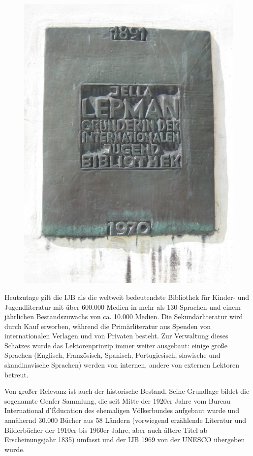 \documentclass[a4paper,
fontsize=11pt,
oneside,
numbers=noperiodatend,
parskip=half-,
bibliography=totoc,
final
]{scrartcl}
\begin{document}
\begin{figure}[htbp]
\centering
\includegraphics{img/bild15.jpg}
\end{figure}

Heutzutage gilt die IJB als die weltweit bedeutendste Bibliothek für
Kinder- und Jugendliteratur mit über 600.000 Medien in mehr als 130
Sprachen und einem jährlichen Bestandszuwachs von ca. 10.000 Medien. Die
Sekundärliteratur wird durch Kauf erworben, während die Primärliteratur
aus Spenden von internationalen Verlagen und von Privaten besteht. Zur
Verwaltung dieses Schatzes wurde das Lektorenprinzip immer weiter
ausgebaut: einige große Sprachen (Englisch, Französisch, Spanisch,
Portugiesisch, slawische und skandinavische Sprachen) werden von
internen, andere von externen Lektoren betreut.~

Von großer Relevanz ist auch der historische Bestand. Seine Grundlage
bildet die sogenannte Genfer Sammlung, die seit Mitte der 1920er Jahre
vom Bureau International d'Éducation des ehemaligen Völkerbundes
aufgebaut wurde und annähernd 30.000 Bücher aus 58 Ländern (vorwiegend
erzählende Literatur und Bilderbücher der 1910er bis 1960er Jahre, aber
auch ältere Titel ab Erscheinungsjahr 1835) umfasst und der IJB 1969 von
der UNESCO übergeben wurde.
\end{document}
